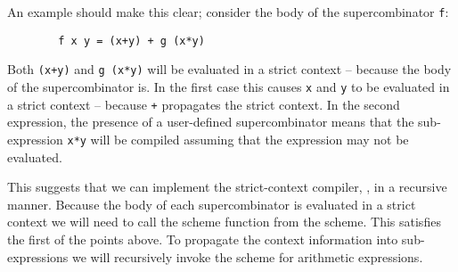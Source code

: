 An example should make this clear; consider the body of the
supercombinator \mbox{\tt f}:
\begin{verbatim}
        f x y = (x+y) + g (x*y)
\end{verbatim}
Both \mbox{\tt (x+y)} and \mbox{\tt g\ (x*y)} will be evaluated in a strict context --
because the body of the supercombinator is. In the first case this
causes \mbox{\tt x} and \mbox{\tt y} to be evaluated in a strict context -- because \mbox{\tt +}
propagates the strict context. In the second expression, the presence
of a user-defined supercombinator means that the sub-expression \mbox{\tt x*y}
will be compiled assuming that the expression may not be evaluated.

This suggests that we can implement the strict-context compiler, \tE{},
in a recursive manner.  Because the body of each supercombinator is
evaluated in a strict context we will need to call the \tE{} scheme
function from the \tR{} scheme. This satisfies the
first of the points above. To propagate the context information into
sub-expressions we will recursively invoke the \tE{} scheme
for arithmetic expressions.

